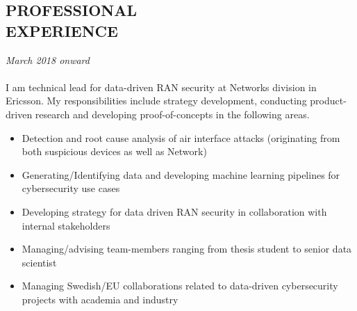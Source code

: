 \documentclass[margin, 10pt]{res} %
\begin{document}
\begin{resume}
\section{PROFESSIONAL \\ EXPERIENCE}

{\sl \textbf{}} \hfill \textit{March 2018 onward} \\
{\color{RubineRed}{Ericsson AB, Sweden}} \\
I am technical lead for data-driven RAN security at Networks division in Ericsson. 
My responsibilities include strategy development, conducting product-driven research and developing proof-of-concepts 
in the following areas.

\begin{itemize}
    \item Detection and root cause analysis of air interface attacks (originating from both suspicious devices as well as Network)
    \item Generating/Identifying data and developing machine learning pipelines for cybersecurity use cases
    \item Developing strategy for data driven RAN security in collaboration with internal stakeholders
    \item Managing/advising team-members ranging from thesis student to senior data scientist
    \item Managing Swedish/EU collaborations related to data-driven cybersecurity projects with academia and industry
\end{itemize}


\end{resume}
\end{document}
